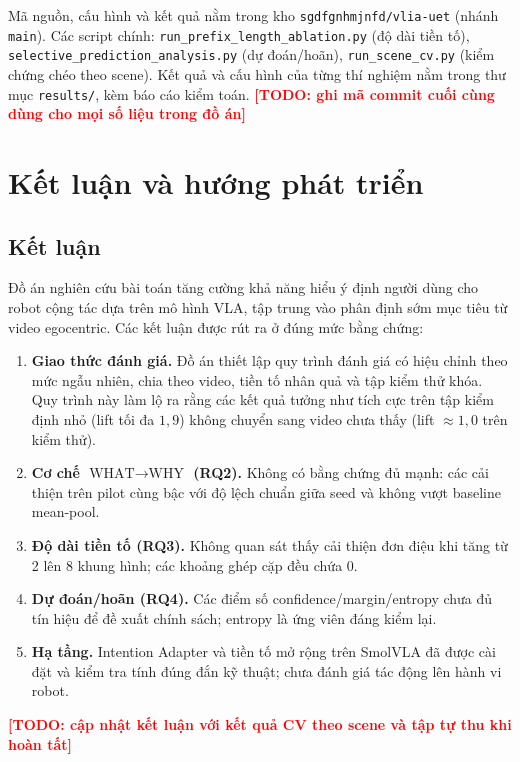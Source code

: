 \documentclass[12pt,a4paper]{report}
\newcommand{\TODO}[1]{\textcolor{red}{\textbf{[TODO: #1]}}}
\begin{document}
Mã nguồn, cấu hình và kết quả nằm trong kho \texttt{sgdfgnhmjnfd/vlia-uet} (nhánh \texttt{main}). Các script chính: \texttt{run\_prefix\_length\_ablation.py} (độ dài tiền tố), \texttt{selective\_prediction\_analysis.py} (dự đoán/hoãn), \texttt{run\_scene\_cv.py} (kiểm chứng chéo theo scene). Kết quả và cấu hình của từng thí nghiệm nằm trong thư mục \texttt{results/}, kèm báo cáo kiểm toán. \TODO{ghi mã commit cuối cùng dùng cho mọi số liệu trong đồ án}

\chapter{Kết luận và hướng phát triển}
\label{chap:conclusion}

\section{Kết luận}

Đồ án nghiên cứu bài toán tăng cường khả năng hiểu ý định người dùng cho robot cộng tác dựa trên mô hình VLA, tập trung vào phân định sớm mục tiêu từ video egocentric. Các kết luận được rút ra ở đúng mức bằng chứng:
\begin{enumerate}
    \item \textbf{Giao thức đánh giá.} Đồ án thiết lập quy trình đánh giá có hiệu chỉnh theo mức ngẫu nhiên, chia theo video, tiền tố nhân quả và tập kiểm thử khóa. Quy trình này làm lộ ra rằng các kết quả tưởng như tích cực trên tập kiểm định nhỏ (lift tối đa $1{,}9$) không chuyển sang video chưa thấy (lift $\approx 1{,}0$ trên kiểm thử).
    \item \textbf{Cơ chế $\text{WHAT}\to\text{WHY}$ (RQ2).} Không có bằng chứng đủ mạnh: các cải thiện trên pilot cùng bậc với độ lệch chuẩn giữa seed và không vượt baseline mean-pool.
    \item \textbf{Độ dài tiền tố (RQ3).} Không quan sát thấy cải thiện đơn điệu khi tăng từ 2 lên 8 khung hình; các khoảng ghép cặp đều chứa 0.
    \item \textbf{Dự đoán/hoãn (RQ4).} Các điểm số confidence/margin/entropy chưa đủ tín hiệu để đề xuất chính sách; entropy là ứng viên đáng kiểm lại.
    \item \textbf{Hạ tầng.} Intention Adapter và tiền tố mở rộng trên SmolVLA đã được cài đặt và kiểm tra tính đúng đắn kỹ thuật; chưa đánh giá tác động lên hành vi robot.
\end{enumerate}
\TODO{cập nhật kết luận với kết quả CV theo scene và tập tự thu khi hoàn tất}
\end{document}
